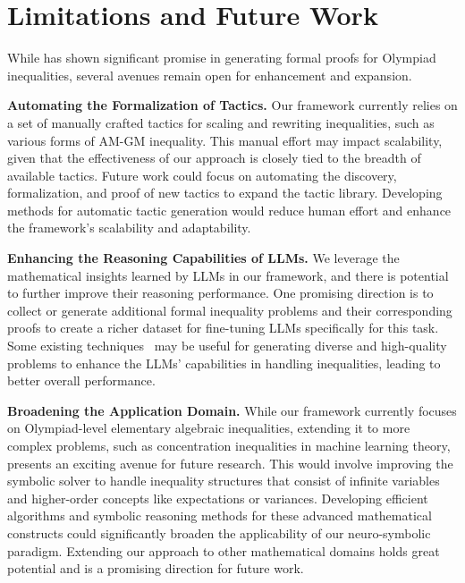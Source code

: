 \section{Limitations and Future Work}

While \name has shown significant promise in generating formal proofs for Olympiad inequalities, several avenues remain open for enhancement and expansion.

{\bf Automating the Formalization of Tactics. } Our framework currently relies on a set of manually crafted tactics for scaling and rewriting inequalities, such as various forms of AM-GM inequality. This manual effort may impact scalability, given that the effectiveness of our approach is closely tied to the breadth of available tactics. Future work could focus on automating the discovery, formalization, and proof of new tactics to expand the tactic library. Developing methods for automatic tactic generation would reduce human effort and enhance the framework's scalability and adaptability.


{\bf Enhancing the Reasoning Capabilities of LLMs. } We leverage the mathematical insights learned by LLMs in our framework, and there is potential to further improve their reasoning performance. One promising direction is to collect or generate additional formal inequality problems and their corresponding proofs to create a richer dataset for fine-tuning LLMs specifically for this task. Some existing techniques~\citep{li2025neuro} may be useful for generating diverse and high-quality problems to enhance the LLMs' capabilities in handling inequalities, leading to better overall performance.


{\bf Broadening the Application Domain. } While our framework currently focuses on Olympiad-level elementary algebraic inequalities, extending it to more complex problems, such as concentration inequalities in machine learning theory, presents an exciting avenue for future research. This would involve improving the symbolic solver to handle inequality structures that consist of infinite variables and higher-order concepts like expectations or variances. Developing efficient algorithms and symbolic reasoning methods for these advanced mathematical constructs could significantly broaden the applicability of our neuro-symbolic paradigm. Extending our approach to other mathematical domains holds great potential and is a promising direction for future work.
